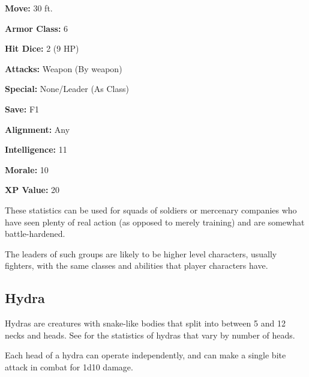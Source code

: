 \begin{multicols*}{2}
{\textbf{Move:} 30 ft.

\textbf{Armor Class:} 6

\textbf{Hit Dice:} 2 (9 HP)

\textbf{Attacks:} Weapon (By weapon)

\textbf{Special:} None/Leader (As Class)

\textbf{Save:} F1

\textbf{Alignment:} Any

\textbf{Intelligence:} 11

\textbf{Morale:} 10

\textbf{XP Value:} 20}

These statistics can be used for squads of soldiers or mercenary companies who have seen plenty of real action (as opposed to merely training) and are somewhat battle-hardened.

The leaders of such groups are likely to be higher level characters, usually fighters, with the same classes and abilities that player characters have.

\subsection{Hydra}

Hydras are creatures with snake-like bodies that split into between 5 and 12 necks and heads. See  for the statistics of hydras that vary by number of heads.

Each head of a hydra can operate independently, and can make a single bite attack in combat for 1d10 damage.


\end{multicols*}
